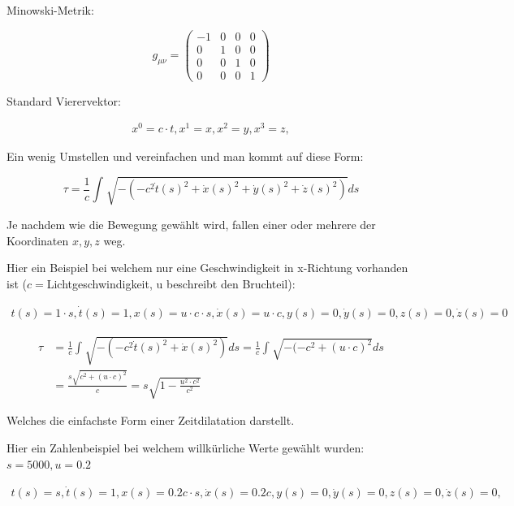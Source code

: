 \begin{refsection}
Minowski-Metrik:

\begin{equation}
    g_{\mu\nu}=
    \begin{pmatrix}
        -1 & 0 & 0 & 0 \\
        0 & 1 & 0 & 0 \\
        0 & 0 & 1 & 0 \\
        0 & 0 & 0 & 1
    \end{pmatrix}
\end{equation}

Standard Vierervektor:

\begin{align*}
    x^{0}=c \cdot t,
    x^{1}=x,
    x^{2}=y,
    x^{3}=z,
\end{align*}

Ein wenig Umstellen und vereinfachen und man kommt auf diese Form:

\begin{equation}
    \tau
    =
    \frac{1}{c}\int_{}^{}\sqrt{-(-c^2\dot{t}(s)^{2}+\dot{x}(s)^{2}+\dot{y}(s)^{2}+\dot{z}(s)^{2})}ds
\end{equation}

Je nachdem wie die Bewegung gew\"ahlt wird, fallen einer oder mehrere der Koordinaten $x, y, z$ weg.

Hier ein Beispiel bei welchem nur eine Geschwindigkeit in x-Richtung vorhanden ist ($c=$Lichtgeschwindigkeit, u beschreibt den Bruchteil):

\begin{align*}
     t(s)=1\cdot s, \dot{t}(s)=1,
 	 x(s)=u\cdot c \cdot s, \dot{x}(s)=u\cdot c,
     y(s)=0, \dot{y}(s)=0,
     z(s)=0, \dot{z}(s)=0
\end{align*}

\begin{align*}
    \tau
    &=
    \frac{1}{c}\int_{}^{}\sqrt{-(-c^2\dot{t}(s)^2+\dot{x}(s)^2)}ds 
    =
    \frac{1}{c}\int_{}^{}\sqrt{-(-c^2 +(u\cdot c)^{2}}ds\\
    &=
    \frac{s\sqrt{c^2+(u\cdot c)^{2}}}{c} 
    =
    s\sqrt{1-\frac{u^2\cdot c^2}{c^2}}
\end{align*}

	Welches die einfachste Form einer Zeitdilatation darstellt.

	Hier ein Zahlenbeispiel bei welchem willkürliche Werte gew\"ahlt wurden:
	$s=5000, u=0.2$ 

\begin{align*}
    t(s)=s, \dot{t}(s)=1,
    x(s)=0.2c \cdot s, \dot{x}(s)=0.2c,
    y(s)=0, \dot{y}(s)=0,
    z(s)=0, \dot{z}(s)=0,
\end{align*}


\end{refsection}
